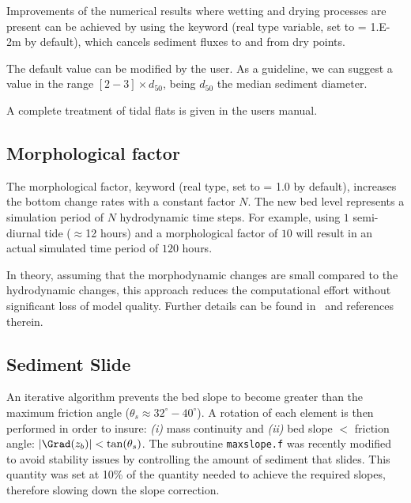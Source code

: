 Improvements of the numerical results where wetting and drying processes are present can be achieved by using the keyword  (real type variable, set to {\ttfamily = 1.E-2}m by default), which cancels sediment fluxes to and from dry points.  

The default value can be modified by the user. As a guideline, we can suggest a value in the range $[2-3]\times d_{50}$, being $d_{50}$ the median sediment diameter.

A complete treatment of tidal flats is given in the  users manual.


\subsection{Morphological factor}
The morphological factor, keyword  (real type, set to {\ttfamily = 1.0} by default), increases the bottom change rates with a constant factor $N$. The new bed level represents a simulation period of $N$ hydrodynamic time steps. For example, using $1$ semi-diurnal tide ($\approx$12 hours) and a morphological factor of $10$ will result in an actual simulated time period of $120$ hours.

In theory, assuming that the morphodynamic changes are small compared to the hydrodynamic changes, 
this approach reduces the computational effort without significant loss of model quality. Further details can be found in~\cite{Knaapen12} and references therein.

\subsection{Sediment Slide}
An iterative algorithm prevents the bed slope to become greater than the maximum friction angle ($\theta_s \approx 32^\circ-40^\circ$). A rotation of each element is then performed in order to insure: \textit{(i)} mass continuity and \textit{(ii)} bed slope $<$ friction angle: $|\Grad(z_b)| < \tan(\theta_s)$. The subroutine \texttt{maxslope.f} was recently modified to avoid stability issues by controlling the amount of sediment that slides. This quantity was set at 10\% of the quantity needed to achieve the required slopes, therefore slowing down the slope correction.\\


